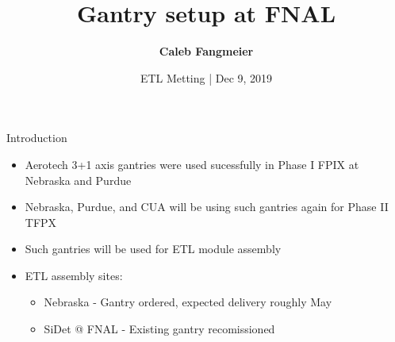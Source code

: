 \documentclass[english,aspectratio=43,8pt]{beamer}
\begin{document}
\title{Gantry setup at FNAL}
\author[C. Fangmeier]{\textbf{Caleb Fangmeier}}
\date{ETL Metting | Dec 9, 2019}


\begin{frame}[plain]
  \titlepage%
\end{frame}

\begin{frame}{Introduction}
      \begin{itemize}
          \item Aerotech 3+1 axis gantries were used sucessfully in Phase I FPIX at Nebraska and Purdue
          \item Nebraska, Purdue, and CUA will be using such gantries again for Phase II TFPX
          \item Such gantries will be used for ETL module assembly
          \item ETL assembly sites:
            \begin{itemize}
                \item Nebraska - Gantry ordered, expected delivery roughly May
                \item SiDet @ FNAL - Existing gantry recomissioned
            \end{itemize}
      \end{itemize}
\end{frame}
\end{document}
